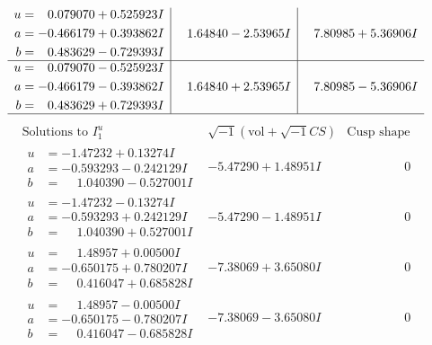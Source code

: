 \documentclass[1p]{elsarticle_modified}
\theoremstyle{definition}
\newcommand{\I}{\sqrt{-1}}
\begin{document}
$$\begin{array}{c|c|c}
\begin{aligned}
u &= \phantom{-}0.079070 + 0.525923 I \\
a &= -0.466179 + 0.393862 I \\
b &= \phantom{-}0.483629 - 0.729393 I\end{aligned}
 & \phantom{-}1.64840 - 2.53965 I & \phantom{-}7.80985 + 5.36906 I \\ \hline\begin{aligned}
u &= \phantom{-}0.079070 - 0.525923 I \\
a &= -0.466179 - 0.393862 I \\
b &= \phantom{-}0.483629 + 0.729393 I\end{aligned}
 & \phantom{-}1.64840 + 2.53965 I & \phantom{-}7.80985 - 5.36906 I\\
 \hline 
 \end{array}$$\newpage$$\begin{array}{c|c|c}  
\text{Solutions to }I^u_{1}& \I (\text{vol} + \sqrt{-1}CS) & \text{Cusp shape}\\
 \hline 
\begin{aligned}
u &= -1.47232 + 0.13274 I \\
a &= -0.593293 - 0.242129 I \\
b &= \phantom{-}1.040390 - 0.527001 I\end{aligned}
 & -5.47290 + 1.48951 I & \phantom{-0.000000 } 0 \\ \hline\begin{aligned}
u &= -1.47232 - 0.13274 I \\
a &= -0.593293 + 0.242129 I \\
b &= \phantom{-}1.040390 + 0.527001 I\end{aligned}
 & -5.47290 - 1.48951 I & \phantom{-0.000000 } 0 \\ \hline\begin{aligned}
u &= \phantom{-}1.48957 + 0.00500 I \\
a &= -0.650175 + 0.780207 I \\
b &= \phantom{-}0.416047 + 0.685828 I\end{aligned}
 & -7.38069 + 3.65080 I & \phantom{-0.000000 } 0 \\ \hline\begin{aligned}
u &= \phantom{-}1.48957 - 0.00500 I \\
a &= -0.650175 - 0.780207 I \\
b &= \phantom{-}0.416047 - 0.685828 I\end{aligned}
 & -7.38069 - 3.65080 I & \phantom{-0.000000 } 0 \\ \hline\begin{aligned}

\end{aligned}
\end{array}$$
\end{document}
